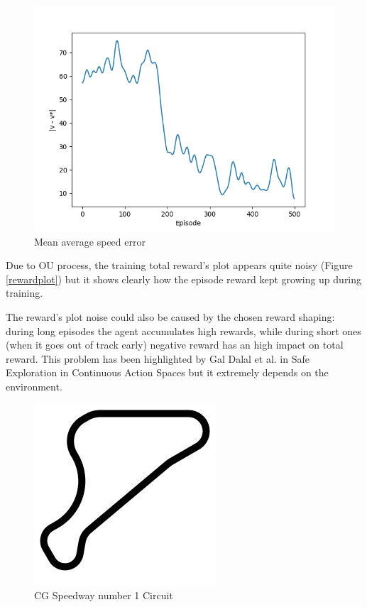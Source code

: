 \documentclass[Lau,oneside,noexaminfo]{sapthesis} %
\begin{document}
\begin{figure}[H]
  \centering
  \includegraphics[width=.8\textwidth]{mean_difference}
  \caption{Mean average speed error}
  \label{mean_difference}
\end{figure}



Due to OU process, the training total reward's plot appears quite noisy (Figure \ref{rewardplot}) but it shows clearly how the episode reward kept growing up during training.

The reward's plot noise could also be caused by the chosen reward shaping: during long episodes the agent accumulates high rewards, while during short ones (when it goes out of track early) negative reward has an high impact on total reward. This problem has been highlighted by Gal Dalal et al. in Safe Exploration in Continuous Action Spaces \cite{SAFEEXPLORATION} but it extremely depends on the environment.
\begin{figure}[H]
  \centering
  \includegraphics[width=.2\textwidth]{g-track-1}
  \caption{CG Speedway number 1 Circuit}
  \label{g-track-1}
\end{figure}
\end{document}
